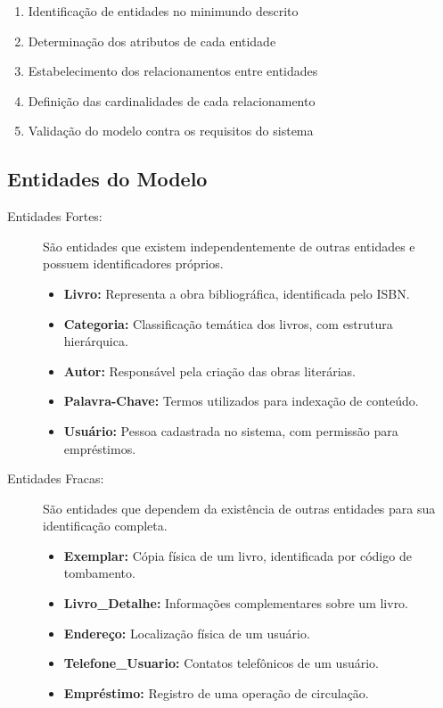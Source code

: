 \documentclass[12pt,a4paper]{article}
\begin{document}
\begin{enumerate}
    \item Identificação de entidades no minimundo descrito
    \item Determinação dos atributos de cada entidade
    \item Estabelecimento dos relacionamentos entre entidades
    \item Definição das cardinalidades de cada relacionamento
    \item Validação do modelo contra os requisitos do sistema
\end{enumerate}

\subsection{Entidades do Modelo}

\begin{conceptbox}
\begin{description}
    \item[Entidades Fortes:] São entidades que existem independentemente de outras entidades e possuem identificadores próprios.
    \begin{itemize}
        \item \textbf{Livro:} Representa a obra bibliográfica, identificada pelo ISBN.
        \item \textbf{Categoria:} Classificação temática dos livros, com estrutura hierárquica.
        \item \textbf{Autor:} Responsável pela criação das obras literárias.
        \item \textbf{Palavra-Chave:} Termos utilizados para indexação de conteúdo.
        \item \textbf{Usuário:} Pessoa cadastrada no sistema, com permissão para empréstimos.
    \end{itemize}
    
    \item[Entidades Fracas:] São entidades que dependem da existência de outras entidades para sua identificação completa.
    \begin{itemize}
        \item \textbf{Exemplar:} Cópia física de um livro, identificada por código de tombamento.
        \item \textbf{Livro\_Detalhe:} Informações complementares sobre um livro.
        \item \textbf{Endereço:} Localização física de um usuário.
        \item \textbf{Telefone\_Usuario:} Contatos telefônicos de um usuário.
        \item \textbf{Empréstimo:} Registro de uma operação de circulação.
    \end{itemize}
\end{description}
\end{conceptbox}
\end{document}

